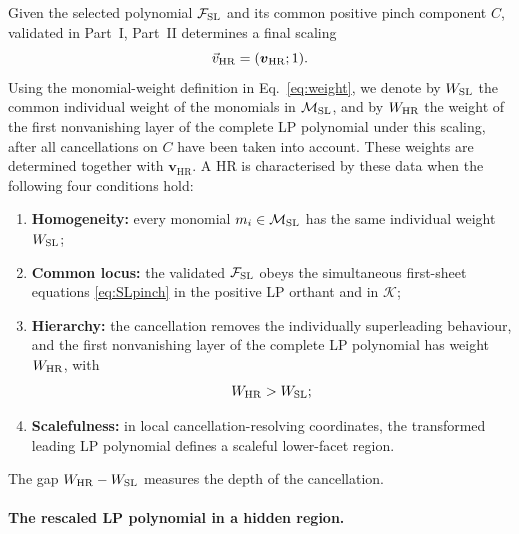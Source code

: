 \documentclass[a4paper,11pt]{article}
\newcommand{\K}{\mathcal K}
\newcommand{\HR}{\mathrm{HR}}
\newcommand{\FSL}{\mathcal F_{\rm SL}}
\newcommand{\MSL}{\mathcal M_{\rm SL}}
\newcommand{\WSL}{W_{\rm SL}}
\newcommand{\WHR}{W_{\rm HR}}
\newcommand{\vHR}{\vec v_{\rm HR}}
\begin{document}
Given the selected polynomial \(\FSL\) and its common positive pinch component
\(C\), validated in Part~I, Part~II determines a final scaling
\begin{equation}
 \vHR=(\boldsymbol v_{\HR};1).
\end{equation}
Using the monomial-weight definition in Eq.~\eqref{eq:weight}, we denote by
\(\WSL\) the common individual weight of the monomials in \(\MSL\), and by
\(\WHR\) the weight of the first nonvanishing layer of the complete LP
polynomial under this scaling, after all cancellations on \(C\) have been
taken into account.  These weights are determined together with
\(\boldsymbol v_{\HR}\).  A HR is characterised by these data when the
following four conditions hold:
\begin{enumerate}[label=(\alph*)]
\item \textbf{Homogeneity:} every monomial \(m_i\in\MSL\) has the same
      individual weight \(\WSL\);
\item \textbf{Common locus:} the validated \(\FSL\) obeys the simultaneous
      first-sheet equations \eqref{eq:SLpinch} in the positive LP orthant and
      in \(\K\);
\item \textbf{Hierarchy:} the cancellation removes the individually
      superleading behaviour, and the first nonvanishing layer of the
      complete LP polynomial has weight \(\WHR\), with
      \begin{equation}
        \WHR>\WSL;
      \label{eq:gap}
      \end{equation}
\item \textbf{Scalefulness:} in local cancellation-resolving coordinates, the
      transformed leading LP polynomial defines a scaleful lower-facet region.
\end{enumerate}
The gap \(\WHR-\WSL\) measures the depth of the cancellation.

\paragraph{The rescaled LP polynomial in a hidden region.}
\label{sec:weight-colours}
\end{document}
